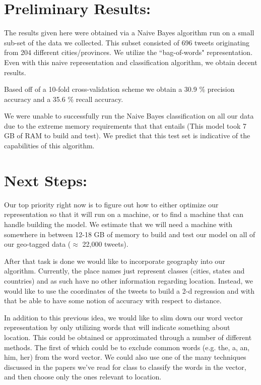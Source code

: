 \documentclass[12pt]{article}
\begin{document}
\section*{Preliminary Results:}
The results given here were obtained via a Naive Bayes algorithm run on a small sub-set of the data we collected. This subset consisted of 696 tweets originating from 204 different cities/provinces. We utilize the ``bag-of-words" representation. Even with this naive representation and classification algorithm, we obtain decent results. 

Based off of a 10-fold cross-validation scheme we obtain a 30.9 \% precision accuracy and a 35.6 \% recall accuracy. 

We were unable to successfully run the Naive Bayes classification on all our data due to the extreme memory requirements that that entails (This model took 7 GB of RAM to build and test). We predict that this test set is indicative of the capabilities of this algorithm. 

\section*{Next Steps:}
Our top priority right now is to figure out how to either optimize our representation so that it will run on a machine, or to find a machine that can handle building the model. We estimate that we will need a machine with somewhere in between 12-18 GB of memory to build and test our model on all of our geo-tagged data ($\approx$ 22,000 tweets).

After that task is done we would like to incorporate geography into our algorithm. Currently, the place names just represent classes (cities, states and countries) and as such have no other information regarding location. Instead, we would like to use the coordinates of the tweets to build a 2-d regression and with that be able to have some notion of accuracy with respect to distance.   

In addition to this previous idea, we would like to slim down our word vector representation by only utilizing words that will indicate something about location. This could be obtained or approximated through a number of different methods. The first of which could be to exclude common words (e.g. the, a, an, him, her) from the word vector. We could also use one of the many techniques discussed in the papers we've read for class to classify the words in the vector, and then choose only the ones relevant to location. 
\end{document}
